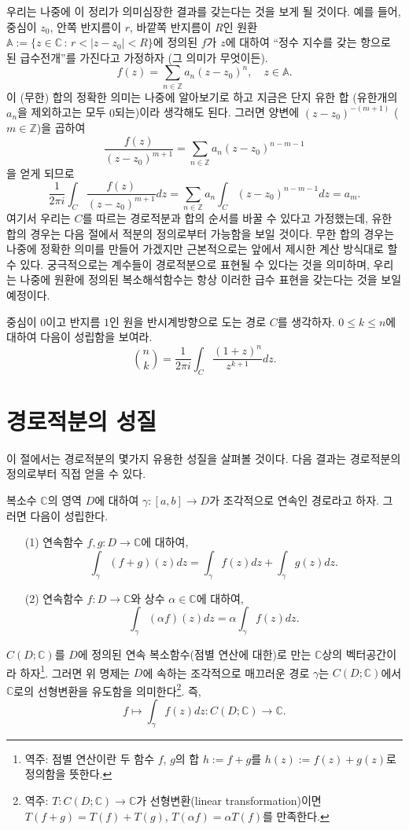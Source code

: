 우리는 나중에 이 정리가 의미심장한 결과를 갖는다는 것을 보게 될 것이다.
예를 들어, 
중심이 $z_0$, 안쪽 반지름이 $r$, 바깥쪽 반지름이 $R$인 
원환 $\mathbb A := \{ z\in\mathbb C \,:\, r<|z-z_0|<R \}$에 정의된
$f$가 $z$에 대하여 ``정수 지수를 갖는 항으로 된 급수전개''를 가진다고 가정하자 
(그 의미가 무엇이든).
\[
f(z) = \sum_{n\in\mathbb Z} a_n (z-z_0)^n, \quad z\in \mathbb A.
\]
이 (무한) 합의 정확한 의미는 나중에 알아보기로 하고
지금은 단지 유한 합 (유한개의 $a_n$을 제외하고는 모두 $0$되는)이라 생각해도 된다.
그러면  양변에 $(z-z_0)^{-(m+1)}$ ($m\in \mathbb Z$)을 곱하여 
\[
\dfrac{f(z)}{(z-z_0)^{m+1}} = \sum_{n\in\mathbb Z} a_n (z-z_0)^{n-m-1}
\]
을 얻게 되므로
\[
\dfrac1{2\pi i} \int_C \frac{f(z)}{(z-z_0)^{m+1}} dz
= \sum_{n\in\mathbb Z} a_n \int_C (z-z_0)^{n-m-1}dz = a_m.
\]
여기서 우리는 $C$를 따르는 경로적분과 합의 순서를 바꿀 수 있다고 가정했는데,
유한 합의 경우는 다음 절에서 적분의 정의로부터 가능함을 보일 것이다.
무한 합의 경우는 나중에 정확한 의미를 만들어 가겠지만 근본적으로는
앞에서 제시한 계산 방식대로 할 수 있다.
궁극적으로는 계수들이 경로적분으로 표현될 수 있다는 것을 의미하며,
우리는 나중에 원환에 정의된 복소해석함수는 항상 이러한 급수 표현을 갖는다는 것을
보일 예정이다.

\begin{salt_exercise} \label{ex-3-5}
중심이 $0$이고 반지름 $1$인 원을 반시계방향으로 도는 경로 $C$를 생각하자.
$0\le k \le n$에 대하여 다음이 성립함을 보여라.
\[
{n \choose k} = \dfrac1{2\pi i}\int_C \dfrac{(1+z)^n}{z^{k+1}} dz.
\]
\end{salt_exercise}

\section{경로적분의 성질}

이 절에서는 경로적분의 몇가지 유용한 성질을 살펴볼 것이다.
다음 결과는 경로적분의 정의로부터 직접 얻을 수 있다.

\begin{saltprop}{}{} \label{prop-3-1}
복소수 $\mathbb C$의 영역 $D$에 대하여
$\gamma: [a,b] \to D$가 조각적으로 연속인 경로라고 하자.
그러면 다음이 성립한다.
\begin{itemize}
\item[(1)] 연속함수 $f,g : D \to \mathbb C$에 대하여,
\[
\int_\gamma (f+g)(z) dz = \int_\gamma f(z)dz + \int_\gamma g(z)dz.
\]
\item[(2)] 연속함수 $f : D \to \mathbb C$와 상수 $\alpha\in\mathbb C$에 대하여,
\[
\int_\gamma  (\alpha f)(z)dz = \alpha \int_\gamma f(z)dz.
\]
\end{itemize}
\end{saltprop}
$C(D;\mathbb C)$를
$D$에 정의된 연속 복소함수(점별 연산에 대한)로 만는 $\mathbb C$상의 
벡터공간이라 하자\footnote{
역주: 점별 연산이란 두 함수 $f$, $g$의 합 $h:=f+g$를 $h(z):=f(z)+g(z)$로 정의함을 뜻한다.}.
그러면 위 명제는 $D$에 속하는 조각적으로 매끄러운 경로 $\gamma$는
$C(D;\mathbb C)$에서 $\mathbb C$로의 선형변환을 유도함을 
의미한다\footnote{역주: $T: C(D;\mathbb C) \to \mathbb C$가 선형변환(linear transformation)이면
$T(f+g) = T(f)+T(g)$, $T(\alpha f) = \alpha T(f)$를 만족한다. }.
즉,
\[
f \mapsto \int_\gamma f(z)dz : C(D;\mathbb C) \to \mathbb C.
\]

